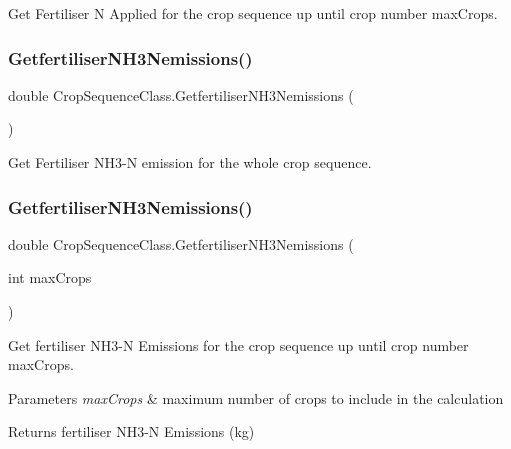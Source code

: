 Get Fertiliser N Applied for the crop sequence up until crop number max\+Crops. 

\mbox{\label{class_crop_sequence_class_ac9bf920b027d33d0ebc1d1a43e1b713e}} 
\subsubsection{\texorpdfstring{GetfertiliserNH3Nemissions()}{GetfertiliserNH3Nemissions()}\hspace{0.1cm}{\footnotesize\ttfamily [1/2]}}
{\footnotesize\ttfamily double Crop\+Sequence\+Class.\+Getfertiliser\+N\+H3\+Nemissions (\begin{DoxyParamCaption}{ }\end{DoxyParamCaption})\hspace{0.3cm}{\ttfamily [inline]}}



Get Fertiliser N\+H3-\/N emission for the whole crop sequence. 

\mbox{\label{class_crop_sequence_class_a61ef6bc1ddc06e99da8951319e1082d9}} 
\subsubsection{\texorpdfstring{GetfertiliserNH3Nemissions()}{GetfertiliserNH3Nemissions()}\hspace{0.1cm}{\footnotesize\ttfamily [2/2]}}
{\footnotesize\ttfamily double Crop\+Sequence\+Class.\+Getfertiliser\+N\+H3\+Nemissions (\begin{DoxyParamCaption}\item[{int}]{max\+Crops }\end{DoxyParamCaption})\hspace{0.3cm}{\ttfamily [inline]}}



Get fertiliser N\+H3-\/N Emissions for the crop sequence up until crop number max\+Crops. 


\begin{DoxyParams}{Parameters}
{\em max\+Crops} & maximum number of crops to include in the calculation \\
\hline
\end{DoxyParams}
\begin{DoxyReturn}{Returns}
fertiliser N\+H3-\/N Emissions (kg) 
\end{DoxyReturn}
\mbox{\label{class_crop_sequence_class_ac21baaca5d6be100861bab0428a2b980}} 
